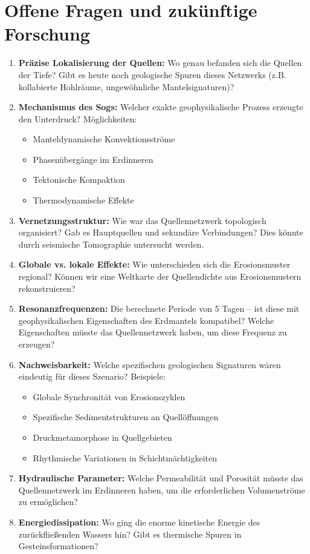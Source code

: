 ﻿\documentclass[12pt,a4paper]{report}
\begin{document}
\section{Offene Fragen und zukünftige Forschung}

\begin{enumerate}
	\item \textbf{Präzise Lokalisierung der Quellen:} Wo genau befanden sich die Quellen der Tiefe? Gibt es heute noch geologische Spuren dieses Netzwerks (z.B. kollabierte Hohlräume, ungewöhnliche Mantelsignaturen)?
	
	\item \textbf{Mechanismus des Sogs:} Welcher exakte geophysikalische Prozess erzeugte den Unterdruck? Möglichkeiten:
	\begin{itemize}
		\item Manteldynamische Konvektionsströme
		\item Phasenübergänge im Erdinneren
		\item Tektonische Kompaktion
		\item Thermodynamische Effekte
	\end{itemize}
	
	\item \textbf{Vernetzungsstruktur:} Wie war das Quellennetzwerk topologisch organisiert? Gab es Hauptquellen und sekundäre Verbindungen? Dies könnte durch seismische Tomographie untersucht werden.
	
	\item \textbf{Globale vs. lokale Effekte:} Wie unterschieden sich die Erosionsmuster regional? Können wir eine Weltkarte der Quellendichte aus Erosionsmustern rekonstruieren?
	
	\item \textbf{Resonanzfrequenzen:} Die berechnete Periode von 5 Tagen -- ist diese mit geophysikalischen Eigenschaften des Erdmantels kompatibel? Welche Eigenschaften müsste das Quellennetzwerk haben, um diese Frequenz zu erzeugen?
	
	\item \textbf{Nachweisbarkeit:} Welche spezifischen geologischen Signaturen wären eindeutig für dieses Szenario? Beispiele:
	\begin{itemize}
		\item Globale Synchronität von Erosionszyklen
		\item Spezifische Sedimentstrukturen an Quellöffnungen
		\item Druckmetamorphose in Quellgebieten
		\item Rhythmische Variationen in Schichtmächtigkeiten
	\end{itemize}
	
	\item \textbf{Hydraulische Parameter:} Welche Permeabilität und Porosität müsste das Quellennetzwerk im Erdinneren haben, um die erforderlichen Volumenströme zu ermög\-lichen?
	
	\item \textbf{Energiedissipation:} Wo ging die enorme kinetische Energie des zurückfließenden Wassers hin? Gibt es thermische Spuren in Gesteinsformationen?
\end{enumerate}
\end{document}
